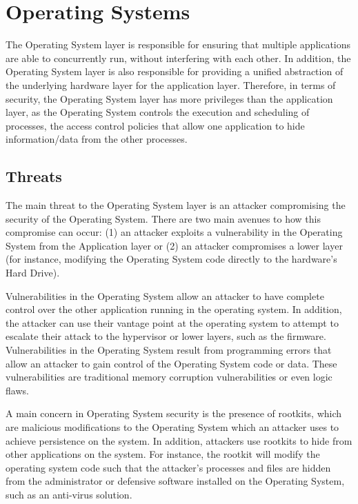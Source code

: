 \documentclass[11pt,letterpaper]{article}
\begin{document}
\section{Operating Systems}

The Operating System layer is responsible for ensuring that multiple
applications are able to concurrently run, without interfering with
each other. In addition, the Operating System layer is also
responsible for providing a unified abstraction of the underlying
hardware layer for the application layer. Therefore, in terms of
security, the Operating System layer has more privileges than the
application layer, as the Operating System controls the execution and
scheduling of processes, the access control policies that allow one
application to hide information/data from the other processes.

\subsection{Threats}

The main threat to the Operating System layer is an attacker
compromising the security of the Operating System. There are two main
avenues to how this compromise can occur: (1) an attacker exploits a
vulnerability in the Operating System from the Application layer or
(2) an attacker compromises a lower layer (for instance, modifying the
Operating System code directly to the hardware's Hard Drive).

Vulnerabilities in the Operating System allow an attacker to have
complete control over the other application running in the operating
system. In addition, the attacker can use their vantage point at the
operating system to attempt to escalate their attack to the hypervisor
or lower layers, such as the firmware. Vulnerabilities in the
Operating System result from programming errors that allow an attacker
to gain control of the Operating System code or data. These
vulnerabilities are traditional memory corruption vulnerabilities or
even logic flaws. 

A main concern in Operating System security is the presence of
rootkits, which are malicious modifications to the Operating System
which an attacker uses to achieve persistence on the system. In
addition, attackers use rootkits to hide from other applications on
the system. For instance, the rootkit will modify the operating system
code such that the attacker's processes and files are hidden from the
administrator or defensive software installed on the Operating System,
such as an anti-virus solution. 
\end{document}

